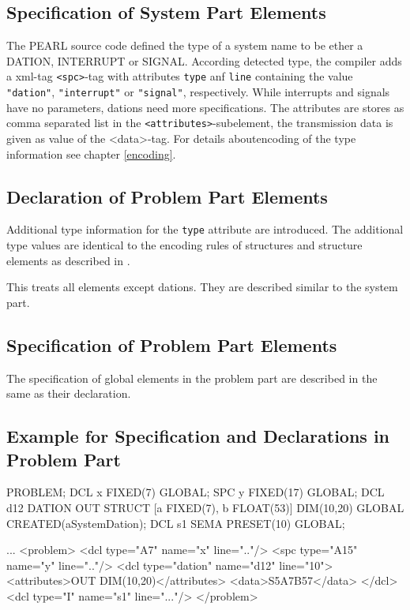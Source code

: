 \subsection{Specification of System Part Elements}
The PEARL source code defined the type of a system name to be ether a DATION, 
INTERRUPT or SIGNAL. According detected type, the compiler 
adds a xml-tag \verb|<spc>|-tag with attributes \verb|type| anf \verb|line|
containing the value \verb|"dation"|, \verb|"interrupt"| or \verb|"signal"|,
 respectively.
While interrupts and signals have no parameters, dations need more
specifications. The attributes are stores as comma separated list in the
\verb|<attributes>|-subelement, the transmission data is given as value
of the <data>-tag. For details aboutencoding of the type information
see chapter \ref{encoding}. 

\subsection{Declaration of Problem Part Elements}

Additional type information for the \verb|type| attribute are introduced.
The additional type values are identical to the  encoding rules of
structures and structure elements  as described in \cite{runtime}.

This treats all elements except dations. They are described similar to the
system part.


\subsection{Specification of Problem Part Elements}
The specification of global  elements in the problem part are described 
in the same as their declaration.

\subsection{Example for Specification and Declarations in Problem Part}

\begin{PEARLCode}
PROBLEM;
   DCL x FIXED(7) GLOBAL;
   SPC y FIXED(17) GLOBAL;
   DCL d12 DATION OUT STRUCT [a FIXED(7), b FLOAT(53)]
     DIM(10,20)  GLOBAL CREATED(aSystemDation);
   DCL s1 SEMA PRESET(10) GLOBAL;
\end{PEARLCode}

\begin{XMLCode}
...
<problem>
  <dcl type="A7" name="x" line=".."/>
  <spc type="A15" name="y" line=".."/>
  <dcl type="dation" name="d12" line="10">
    <attributes>OUT DIM(10,20)</attributes>
    <data>S5A7B57</data>
  </dcl>
  <dcl type="I" name="s1" line="..."/>
</problem>
\end{XMLCode}



